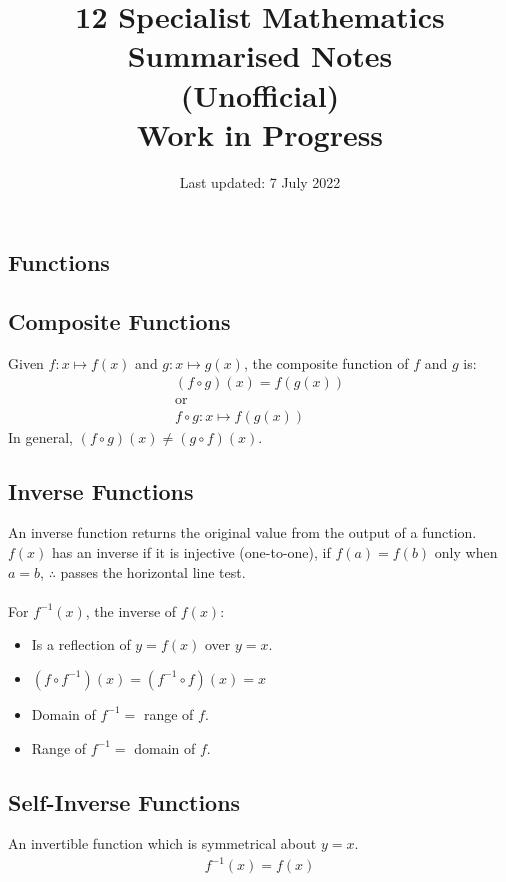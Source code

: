 \documentclass[10pt, a4paper, titlepage]{article}
\title{12 Specialist Mathematics Summarised Notes \\ (Unofficial) \\ Work in Progress}
\author{}
\date{Last updated: 7 July 2022}
\begin{document}
\maketitle
\begin{multicols*}{3}

\section{Functions}
	\subsection{Composite Functions}
	Given $f:x\mapsto f(x)$ and $g:x\mapsto g(x)$, the composite function of $f$ and $g$ is:
	\begin{gather}
		(f\circ g)(x)=f(g(x))\\
		\text{or}\\
		f\circ g:x\mapsto f(g(x))
	\end{gather}
	In general, $(f\circ g)(x)\neq (g\circ f)(x)$.

	\dotfill
	\subsection{Inverse Functions}
	An inverse function returns the original value from the output of a function.\\
	$f(x)$ has an inverse if it is injective (one-to-one), if $f(a)=f(b)$ only when $a=b$, $\therefore$ passes the horizontal line test.\\\\
	For $f^{-1}(x)$, the inverse of $f(x)$:
	\begin{itemize}
		\item Is a reflection of $y=f(x)$ over $y=x$.
		\item $(f\circ f^{-1})(x)=(f^{-1}\circ f)(x)=x$
		\item Domain of $f^{-1}=$ range of $f$.
		\item Range of $f^{-1}=$ domain of $f$.
	\end{itemize}

	\dotfill
	\subsection{Self-Inverse Functions}
	An invertible function which is symmetrical about $y=x$.
	\begin{align}
		f^{-1}(x)=f(x)
	\end{align}

	\dotfill

\end{multicols*}
\end{document}

